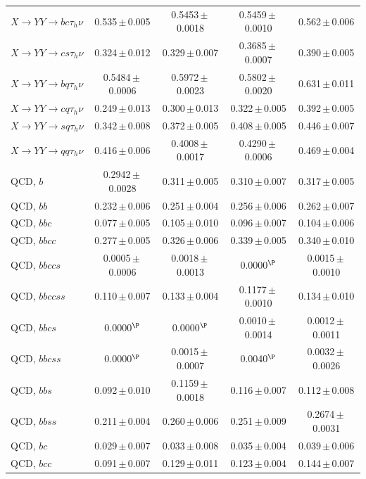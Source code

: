 \documentclass[12pt]{article}   %
\begin{document}
\begin{landscape}
{\begin{longtable}{@{\extracolsep{\fill}}lcccc@{}}
\midrule
$X\to YY\to bc\tau_h\nu$ & 0.535\,$\pm$\,0.005 & 0.5453\,$\pm$\,0.0018 & 0.5459\,$\pm$\,0.0010 & 0.562\,$\pm$\,0.006 \\
$X\to YY\to cs\tau_h\nu$ & 0.324\,$\pm$\,0.012 & 0.329\,$\pm$\,0.007 & 0.3685\,$\pm$\,0.0007 & 0.390\,$\pm$\,0.005 \\
$X\to YY\to bq\tau_h\nu$ & 0.5484\,$\pm$\,0.0006 & 0.5972\,$\pm$\,0.0023 & 0.5802\,$\pm$\,0.0020 & 0.631\,$\pm$\,0.011 \\
$X\to YY\to cq\tau_h\nu$ & 0.249\,$\pm$\,0.013 & 0.300\,$\pm$\,0.013 & 0.322\,$\pm$\,0.005 & 0.392\,$\pm$\,0.005 \\
$X\to YY\to sq\tau_h\nu$ & 0.342\,$\pm$\,0.008 & 0.372\,$\pm$\,0.005 & 0.408\,$\pm$\,0.005 & 0.446\,$\pm$\,0.007 \\
$X\to YY\to qq\tau_h\nu$ & 0.416\,$\pm$\,0.006 & 0.4008\,$\pm$\,0.0017 & 0.4290\,$\pm$\,0.0006 & 0.469\,$\pm$\,0.004 \\
\midrule
QCD, $b$ & 0.2942\,$\pm$\,0.0028 & 0.311\,$\pm$\,0.005 & 0.310\,$\pm$\,0.007 & 0.317\,$\pm$\,0.005 \\
QCD, $bb$ & 0.232\,$\pm$\,0.006 & 0.251\,$\pm$\,0.004 & 0.256\,$\pm$\,0.006 & 0.262\,$\pm$\,0.007 \\
QCD, $bbc$ & 0.077\,$\pm$\,0.005 & 0.105\,$\pm$\,0.010 & 0.096\,$\pm$\,0.007 & 0.104\,$\pm$\,0.006 \\
QCD, $bbcc$ & 0.277\,$\pm$\,0.005 & 0.326\,$\pm$\,0.006 & 0.339\,$\pm$\,0.005 & 0.340\,$\pm$\,0.010 \\
QCD, $bbccs$ & 0.0005\,$\pm$\,0.0006 & 0.0018\,$\pm$\,0.0013 & 0.0000$^{\P}$ & 0.0015\,$\pm$\,0.0010 \\
QCD, $bbccss$ & 0.110\,$\pm$\,0.007 & 0.133\,$\pm$\,0.004 & 0.1177\,$\pm$\,0.0010 & 0.134\,$\pm$\,0.010 \\
QCD, $bbcs$ & 0.0000$^{\P}$ & 0.0000$^{\P}$ & 0.0010\,$\pm$\,0.0014 & 0.0012\,$\pm$\,0.0011 \\
QCD, $bbcss$ & 0.0000$^{\P}$ & 0.0015\,$\pm$\,0.0007 & 0.0040$^{\P}$ & 0.0032\,$\pm$\,0.0026 \\
QCD, $bbs$ & 0.092\,$\pm$\,0.010 & 0.1159\,$\pm$\,0.0018 & 0.116\,$\pm$\,0.007 & 0.112\,$\pm$\,0.008 \\
QCD, $bbss$ & 0.211\,$\pm$\,0.004 & 0.260\,$\pm$\,0.006 & 0.251\,$\pm$\,0.009 & 0.2674\,$\pm$\,0.0031 \\
QCD, $bc$ & 0.029\,$\pm$\,0.007 & 0.033\,$\pm$\,0.008 & 0.035\,$\pm$\,0.004 & 0.039\,$\pm$\,0.006 \\
QCD, $bcc$ & 0.091\,$\pm$\,0.007 & 0.129\,$\pm$\,0.011 & 0.123\,$\pm$\,0.004 & 0.144\,$\pm$\,0.007 \\

\end{longtable}}
\end{landscape}
\end{document}
